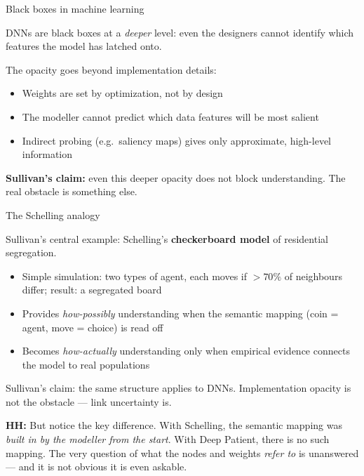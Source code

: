 \documentclass[fleql]{beamer}
\newcommand{\kw}[1]{\textbf{#1}}
\begin{document}
\begin{frame}{Black boxes in machine learning}

  DNNs are black boxes at a \emph{deeper} level: even the
  designers cannot identify which features the model has latched onto.

  \vspace{0.5em}
  The opacity goes beyond implementation details:
  \begin{itemize}
  \item Weights are set by optimization, not by design
  \item The modeller cannot predict which data features
    will be most salient
  \item Indirect probing (e.g.\ saliency maps) gives only
    approximate, high-level information
  \end{itemize}

  \vspace{0.5em}
  \textbf{Sullivan's claim:} even this deeper opacity does not
  block understanding. The real obstacle is something else.

\end{frame}

\begin{frame}{The Schelling analogy}

  Sullivan's central example: Schelling's \kw{checkerboard model}
  of residential segregation.
  \begin{itemize}
  \item Simple simulation: two types of agent, each moves if
    $>70\%$ of neighbours differ; result: a segregated board
  \item Provides \emph{how-possibly} understanding when the
    semantic mapping (coin = agent, move = choice) is read off
  \item Becomes \emph{how-actually} understanding only when
    empirical evidence connects the model to real populations
  \end{itemize}

  \vspace{0.5em}
  Sullivan's claim: the same structure applies to DNNs.
  Implementation opacity is not the obstacle --- link uncertainty is.

  \vspace{0.4em}
  \small \textbf{HH:} But notice the key difference. With Schelling,
  the semantic mapping was \emph{built in by the modeller from the
  start}. With Deep Patient, there is no such mapping. The very
  question of what the nodes and weights \emph{refer to} is
  unanswered --- and it is not obvious it is even askable.

\end{frame}
\end{document}

